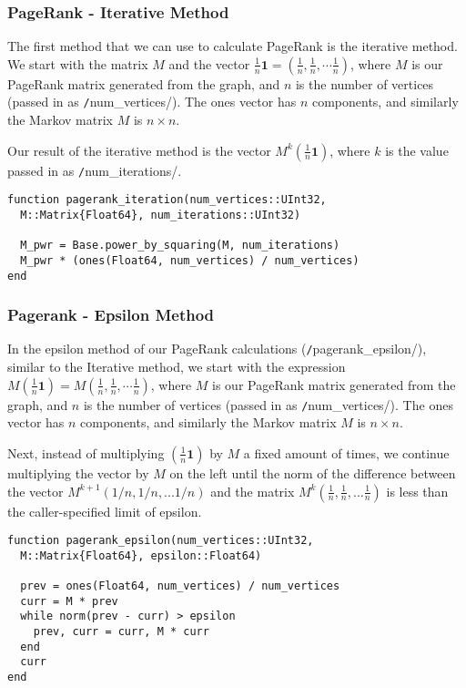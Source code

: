 \documentclass[12pt, titlepage, twoside]{amsart}
\renewcommand{\vec}[1]{\ensuremath{\mathbf{#1}}}
\theoremstyle{remark}
\begin{document}
\subsubsection{PageRank - Iterative Method}

The first method that we can use to calculate PageRank is the iterative method. 
We start with the matrix $M$ and the vector $\frac{1}{n}\vec{1} = (\frac{1}{n}, \frac{1}{n}, \cdots \frac{1}{n})$, 
where $M$ is our PageRank matrix generated from the graph, 
and $n$ is the number of vertices (passed in as \texttt/num_vertices/).
The ones vector has $n$ components, and similarly the Markov matrix $M$ is $n\times n$.

Our result of the iterative method is the vector $M^k (\frac{1}{n}\vec{1})$, 
where $k$ is the value passed in as \texttt/num_iterations/.

\begin{verbatim}
function pagerank_iteration(num_vertices::UInt32,
  M::Matrix{Float64}, num_iterations::UInt32)
  
  M_pwr = Base.power_by_squaring(M, num_iterations)
  M_pwr * (ones(Float64, num_vertices) / num_vertices)
end
\end{verbatim}


 \subsubsection{Pagerank - Epsilon Method}

In the epsilon method of our PageRank calculations (\texttt/pagerank_epsilon/), 
similar to the Iterative method, 
we start with the expression $M(\frac{1}{n}\vec{1}) = M(\frac{1}{n}, \frac{1}{n}, \cdots \frac{1}{n})$, 
where $M$ is our PageRank matrix generated from the graph, 
and $n$ is the number of vertices (passed in as \texttt/num_vertices/). 
The ones vector has $n$ components, and similarly the Markov matrix $M$ is $n\times n$.

Next, instead of multiplying $(\frac{1}{n}\vec{1})$ by $M$ a fixed amount of times,
we continue multiplying the vector by $M$ on the left until the norm of the difference between the vector $M^{k+1}(1/n, 1/n, ... 1/n)$
and the matrix $M^k(\frac{1}{n}, \frac{1}{n}, ... \frac{1}{n})$ is
less than the caller-specified limit of epsilon.

\begin{lstlisting}
function pagerank_epsilon(num_vertices::UInt32, 
  M::Matrix{Float64}, epsilon::Float64)
  
  prev = ones(Float64, num_vertices) / num_vertices
  curr = M * prev
  while norm(prev - curr) > epsilon
    prev, curr = curr, M * curr
  end
  curr
end
\end{lstlisting}
\end{document}
